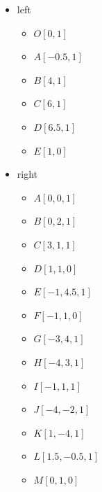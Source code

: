 \documentclass[11pt]{article}
\begin{document}
\begin{enumerate}
\begin{tcolorbox}
\begin{studentSpace}
\begin{minipage}{0.45\textwidth}
\begin{itemize}
    \item left
    \begin{itemize}
        \item $O[0,1]$
        \item $A[-0.5,1]$
        \item $B[4,1]$
        \item $C[6,1]$
        \item $D[6.5,1]$
        \item $E[1,0]$
    \end{itemize}
\end{itemize}
\end{minipage} \hfill
\begin{minipage}{0.45\textwidth}
\begin{itemize}
    \item right
    \begin{itemize}
        \item $A[0,0,1]$
        \item $B[0,2,1]$
        \item $C[3,1,1]$
        \item $D[1,1,0]$
        \item $E[-1,4.5,1]$
        \item $F[-1,1,0]$
        \item $G[-3,4,1]$
        \item $H[-4,3,1]$
        \item $I[-1,1,1]$
        \item $J[-4,-2,1]$
        \item $K[1,-4,1]$
        \item $L[1.5,-0.5,1]$
         \item $M[0,1,0]$
        
    \end{itemize}
\end{itemize}
\end{minipage}
\end{studentSpace}




\end{tcolorbox}
\end{enumerate}
\end{document}
